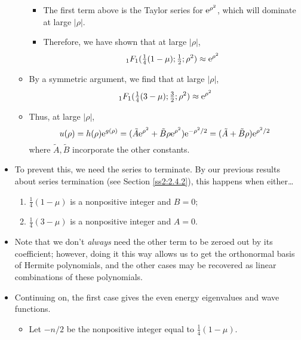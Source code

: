 \documentclass[../finalProject.tex]{subfiles}
\begin{document}
\begin{itemize}
\begin{itemize}
\begin{itemize}
            \item The first term above is the Taylor series for $\e[\rho^2]$, which will dominate at large $|\rho|$.
            \item Therefore, we have shown that at large $|\rho|$,
            \begin{equation*}
                {}_1F_1(\tfrac{1}{4}(1-\mu);\tfrac{1}{2};\rho^2) \approx \e[\rho^2]
            \end{equation*}
        \end{itemize}
        \item By a symmetric argument, we find that at large $|\rho|$,
        \begin{equation*}
            {}_1F_1(\tfrac{1}{4}(3-\mu);\tfrac{3}{2};\rho^2) \approx \e[\rho^2]
        \end{equation*}
        \item Thus, at large $|\rho|$,
        \begin{equation*}
            u(\rho) = h(\rho)\e[g(\rho)]
            = (\tilde{A}\e[\rho^2]+\tilde{B}\rho\e[\rho^2])\e[-\rho^2/2]
            = (\tilde{A}+\tilde{B}\rho)\e[\rho^2/2]
        \end{equation*}
        where $\tilde{A},\tilde{B}$ incorporate the other constants.
    \end{itemize}
    \item To prevent this, we need the series to terminate. By our previous results about series termination (see Section \ref{ss2:2.4.2}), this happens when either\dots
    \begin{enumerate}
        \item $\frac{1}{4}(1-\mu)$ is a nonpositive integer and $B=0$;
        \item $\frac{1}{4}(3-\mu)$ is a nonpositive integer and $A=0$.
    \end{enumerate}
    \item Note that we don't \emph{always} need the other term to be zeroed out by its coefficient; however, doing it this way allows us to get the orthonormal basis of Hermite polynomials, and the other cases may be recovered as linear combinations of these polynomials.
    \item Continuing on, the first case gives the even energy eigenvalues and wave functions.
    \begin{itemize}
        \item Let $-n/2$ be the nonpositive integer equal to $\frac{1}{4}(1-\mu)$.
        \begin{itemize}

\end{itemize}
\end{itemize}
\end{itemize}
\end{document}
